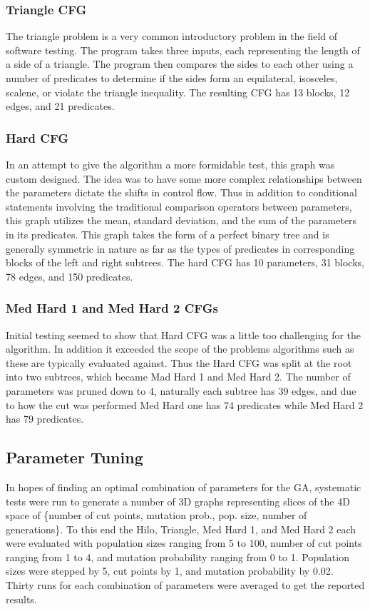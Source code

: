 \documentclass[runningheads]{llncs}
\begin{document}
\subsubsection{Triangle CFG}
The triangle problem is a very common introductory problem in the field of software testing. The program takes three inputs, each representing the length of a side of a triangle. The program then compares the sides to each other using a number of predicates to determine if the sides form an equilateral, isosceles, scalene, or violate the triangle inequality. The resulting CFG has 13 blocks, 12 edges, and 21 predicates.

\subsubsection{Hard CFG}
In an attempt to give the algorithm a more formidable test, this graph was custom designed. The idea was to have some more complex relationships between the parameters dictate the shifts in control flow. Thus in addition to conditional statements involving the traditional comparison operators between parameters, this graph utilizes the mean, standard deviation, and the sum of the parameters in its predicates. This graph takes the form of a perfect binary tree and is generally symmetric in nature as far as the types of predicates in corresponding blocks of the left and right subtrees. The hard CFG has 10 parameters, 31 blocks, 78 edges, and 150 predicates.

\subsubsection{Med Hard 1 and Med Hard 2 CFGs}
Initial testing seemed to show that Hard CFG was a little too challenging for the algorithm. In addition it exceeded the scope of the problems algorithms such as these are typically evaluated against. Thus the Hard CFG was split at the root into two subtrees, which became Mad Hard 1 and Med Hard 2. The number of parameters was pruned down to 4, naturally each subtree has 39 edges, and due to how the cut was performed Med Hard one has 74 predicates while Med Hard 2 has 79 predicates.



\subsection{Parameter Tuning} 
In hopes of finding an optimal combination of parameters for the GA, systematic tests were run to generate a number of 3D graphs representing slices of the 4D space of \{number of cut points, mutation prob., pop. size, number of generations\}. To this end the Hilo, Triangle, Med Hard 1, and Med Hard 2 each were evaluated with population sizes ranging from 5 to 100, number of cut points ranging from 1 to 4, and mutation probability ranging from 0 to 1. Population sizes were stepped by 5, cut points by 1, and mutation probability by 0.02. Thirty runs for each combination of parameters were averaged to get the reported results. 
\end{document}
